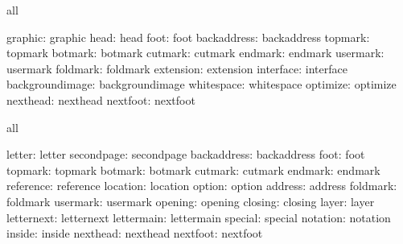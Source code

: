 



\unprotect


\startconstants            all

                  graphic: graphic
                     head: head
                     foot: foot
              backaddress: backaddress
                  topmark: topmark
                  botmark: botmark
                  cutmark: cutmark
                  endmark: endmark
                 usermark: usermark
                 foldmark: foldmark
                extension: extension
                interface: interface
          backgroundimage: backgroundimage
               whitespace: whitespace
                 optimize: optimize
                 nexthead: nexthead
                 nextfoot: nextfoot
\stopconstants

\startvariables            all

                   letter: letter
               secondpage: secondpage
              backaddress: backaddress
                     foot: foot
                  topmark: topmark
                  botmark: botmark
                  cutmark: cutmark
                  endmark: endmark
                reference: reference
                 location: location
                   option: option
                  address: address
                 foldmark: foldmark
                 usermark: usermark
                  opening: opening
                  closing: closing
                    layer: layer
               letternext: letternext
               lettermain: lettermain
                  special: special
                 notation: notation
                   inside: inside
                 nexthead: nexthead
                 nextfoot: nextfoot
\stopvariables



